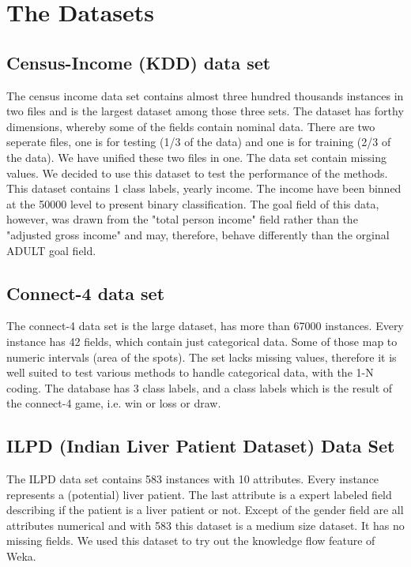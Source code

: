 \documentclass[a4paper]{article}
\begin{document}
\section{The Datasets}
\subsection{Census-Income (KDD)  data set}
The census income data set contains almost three hundred thousands instances in
two files and is the largest dataset among those three sets. The dataset has
forthy dimensions, whereby some of the fields contain nominal data. There are
two seperate files, one is for testing (1/3 of the data) and one is for
training (2/3 of the data). We have unified these two files in one. The data set
contain missing values. We decided to use this dataset to test the performance
of the methods. This dataset contains 1 class labels, yearly income. The income
have been binned at the 50000 level to present binary classification. The goal
field of this data, however, was drawn from the "total person income" field
rather than the "adjusted gross income" and may, therefore, behave differently
than the orginal ADULT goal field.

\subsection{Connect-4 data set}
The connect-4 data set is the large dataset, has more than 67000 instances.
Every instance has 42 fields, which contain just categorical data. Some of those
map to numeric intervals
(area of the spots). The set lacks missing values, therefore it is well suited
to test various methods to handle categorical data, with the 1-N coding. The
database has 3 class labels, and a class labels which
is the result of the connect-4 game, i.e. win or loss or draw.

\subsection{ILPD (Indian Liver Patient Dataset) Data Set}
The ILPD data set contains 583 instances with 10 attributes. Every instance
represents a (potential) liver patient. The last attribute is a expert labeled
field describing if the patient is 
a liver patient or not. Except of the gender field are all attributes numerical
and with 583 this dataset is a medium size dataset. It has no missing fields. 
We used this dataset to try out the knowledge flow feature of Weka.
\end{document}
